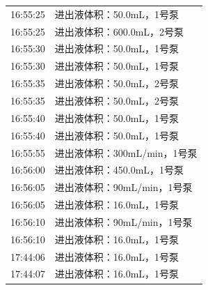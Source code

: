 \documentclass[UTF8,10pt,a4paper,fontset=fandol]{ctexart}
\begin{document}
{\begin{minipage}{0.98\textheight}
\begin{tabularx}{\textwidth}{@{}p{1.6cm}X@{}}
16:55:25 & 进出液体积：50.0mL，1号泵\\
16:55:25 & 进出液体积：600.0mL，2号泵\\
16:55:30 & 进出液体积：50.0mL，1号泵\\
16:55:30 & 进出液体积：50.0mL，1号泵\\
16:55:35 & 进出液体积：50.0mL，2号泵\\
16:55:35 & 进出液体积：50.0mL，2号泵\\
16:55:40 & 进出液体积：50.0mL，1号泵\\
16:55:40 & 进出液体积：50.0mL，1号泵\\
16:55:55 & 进出液体积：300mL/min，1号泵\\
16:56:00 & 进出液体积：450.0mL，1号泵\\
16:56:05 & 进出液体积：90mL/min，1号泵\\
16:56:05 & 进出液体积：16.0mL，1号泵\\
16:56:10 & 进出液体积：90mL/min，1号泵\\
16:56:10 & 进出液体积：16.0mL，1号泵\\
17:44:06 & 进出液体积：16.0mL，1号泵\\
17:44:07 & 进出液体积：16.0mL，1号泵\\
\end{tabularx}

\end{minipage}%
}

\newpage

\end{document}
